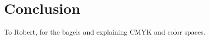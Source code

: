 \documentclass[acmsmall,review,screen]{acmart}
\begin{document}


\section{Conclusion}



\begin{acks}
To Robert, for the bagels and explaining CMYK and color spaces.
\end{acks}








\appendix


\end{document}
